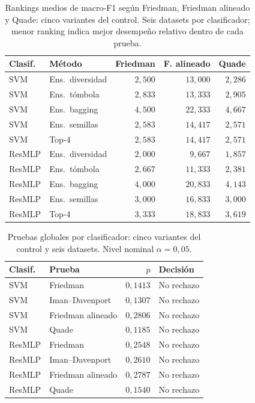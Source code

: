 \begin{table}[H]
\centering\fontsize{8}{10}\selectfont\setlength{\tabcolsep}{3.0pt}
\caption{Rankings medios de macro-F1 según Friedman, Friedman alineado y Quade: cinco variantes del control. Seis datasets por clasificador; menor ranking indica mejor desempeño relativo dentro de cada prueba.}
\label{tab:sel-control-rankings}
\begin{tabular}{@{}llrrr@{}}
\toprule
Clasif. & Método & Friedman & F. alineado & Quade \\
\midrule
SVM & Ens.\ diversidad & $2{,}500$ & $13{,}000$ & $2{,}286$ \\
SVM & Ens.\ tómbola & $2{,}833$ & $13{,}333$ & $2{,}905$ \\
SVM & Ens.\ bagging & $4{,}500$ & $22{,}333$ & $4{,}667$ \\
SVM & Ens.\ semillas & $2{,}583$ & $14{,}417$ & $2{,}571$ \\
SVM & Top-4 & $2{,}583$ & $14{,}417$ & $2{,}571$ \\
ResMLP & Ens.\ diversidad & $2{,}000$ & $9{,}667$ & $1{,}857$ \\
ResMLP & Ens.\ tómbola & $2{,}667$ & $11{,}333$ & $2{,}381$ \\
ResMLP & Ens.\ bagging & $4{,}000$ & $20{,}833$ & $4{,}143$ \\
ResMLP & Ens.\ semillas & $3{,}000$ & $16{,}833$ & $3{,}000$ \\
ResMLP & Top-4 & $3{,}333$ & $18{,}833$ & $3{,}619$ \\
\bottomrule
\end{tabular}
\end{table}
\begin{table}[H]
\centering\fontsize{8}{10}\selectfont\setlength{\tabcolsep}{3.0pt}
\caption{Pruebas globales por clasificador: cinco variantes del control y seis datasets. Nivel nominal $\alpha=0{,}05$.}
\label{tab:sel-control-global}
\begin{tabular}{@{}llrl@{}}
\toprule
Clasif. & Prueba & $p$ & Decisión \\
\midrule
SVM & Friedman & $0{,}1413$ & No rechazo \\
SVM & Iman--Davenport & $0{,}1307$ & No rechazo \\
SVM & Friedman alineado & $0{,}2806$ & No rechazo \\
SVM & Quade & $0{,}1185$ & No rechazo \\
ResMLP & Friedman & $0{,}2548$ & No rechazo \\
ResMLP & Iman--Davenport & $0{,}2610$ & No rechazo \\
ResMLP & Friedman alineado & $0{,}2787$ & No rechazo \\
ResMLP & Quade & $0{,}1540$ & No rechazo \\
\bottomrule
\end{tabular}
\end{table}
